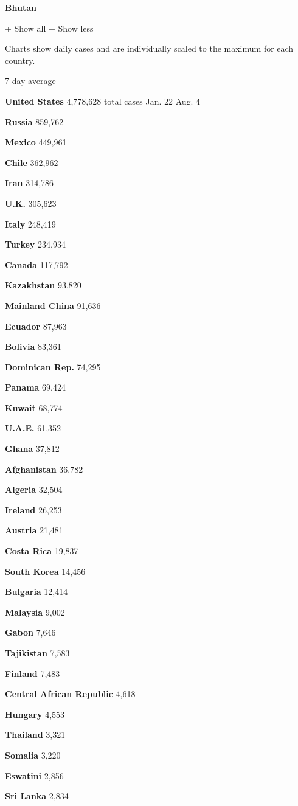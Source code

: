 \textbf{Bhutan}

+ Show all + Show less

Charts show daily cases and are individually scaled to the maximum for
each country.

7-day average

\textbf{United States} 4,778,628 total cases Jan. 22 Aug. 4

\textbf{Russia} 859,762

\textbf{Mexico} 449,961

\textbf{Chile} 362,962

\textbf{Iran} 314,786

\textbf{U.K.} 305,623

\textbf{Italy} 248,419

\textbf{Turkey} 234,934

\textbf{Canada} 117,792

\textbf{Kazakhstan} 93,820

\textbf{Mainland China} 91,636

\textbf{Ecuador} 87,963

\textbf{Bolivia} 83,361

\textbf{Dominican Rep.} 74,295

\textbf{Panama} 69,424

\textbf{Kuwait} 68,774

\textbf{U.A.E.} 61,352

\textbf{Ghana} 37,812

\textbf{Afghanistan} 36,782

\textbf{Algeria} 32,504

\textbf{Ireland} 26,253

\textbf{Austria} 21,481

\textbf{Costa Rica} 19,837

\textbf{South Korea} 14,456

\textbf{Bulgaria} 12,414

\textbf{Malaysia} 9,002

\textbf{Gabon} 7,646

\textbf{Tajikistan} 7,583

\textbf{Finland} 7,483

\textbf{Central African Republic} 4,618

\textbf{Hungary} 4,553

\textbf{Thailand} 3,321

\textbf{Somalia} 3,220

\textbf{Eswatini} 2,856

\textbf{Sri Lanka} 2,834

